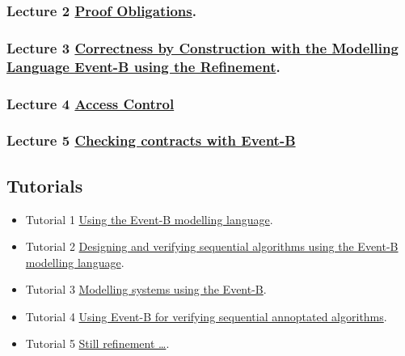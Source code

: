 \documentclass[ 12pt]{article}
\begin{document}
  
\subsubsection{ Lecture 2 
    \href{http://mery54.github.io/teaching/mosos/lecturesnotes/masterillect1-2.pdf}{Proof 
      Obligations}.}

\subsubsection{Lecture 3 
    \href{http://mery54.github.io/teaching/mosos/lecturesnotes/masterillect2.pdf}{Correctness by Construction with the  
      Modelling Language Event-B using the Refinement}.}

  \subsubsection{ Lecture 4 
    \href{http://mery54.github.io/teaching/mosos/lecturesnotes/masterillect3.pdf}{Access 
      Control }}


\subsubsection{ Lecture 5
    \href{http://mery54.github.io/teaching/mosos/lecturesnotes/masterillect-verification.pdf}{Checking contracts with Event-B}}

      
  
\subsection{Tutorials}

  \begin{itemize}
  \item[]   Tutorial 1
    \href{http://mery54.github.io/teaching/mosos/lecturesnotes/master-tutorial1.pdf}{Using 
      the Event-B modelling language}.

     \item[]   Tutorial 2
    \href{http://mery54.github.io/teaching/mosos/lecturesnotes/master-tutorial2.pdf}{
      Designing and verifying sequential algorithms using the Event-B
      modelling language}.

        \item[]   Tutorial 3
    \href{http://mery54.github.io/teaching/mosos/lecturesnotes/master-tutorial3.pdf}{
      Modelling   systems  using the Event-B}.

   \item[]   Tutorial 4
    \href{http://mery54.github.io/teaching/mosos/lecturesnotes/master-tutorial4.pdf}{
      Using  Event-B  for  verifying sequential  annoptated algorithms}.


  
   \item[]   Tutorial 5
    \href{http://mery54.github.io/teaching/mosos/lecturesnotes/master-tutorial5.pdf}{
      Still refinement \ldots}.

  
    
  \end{itemize}
\end{document}
